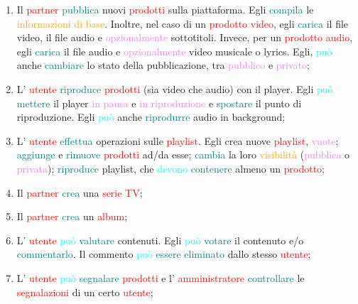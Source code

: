 \begin{enumerate}
    \item Il \textcolor{red}{partner} \textcolor{teal}{pubblica} nuovi \textcolor{red}{prodotti} sulla piattaforma. Egli \textcolor{teal}{compila}
    le \textcolor{orange}{informazioni di base}. Inoltre, nel caso di un 
    \textcolor{red}{prodotto video}, egli \textcolor{teal}{carica} il file video, il file audio e \textcolor{violet}{opzionalmente} sottotitoli.
    Invece, per un \textcolor{red}{prodotto audio}, egli \textcolor{teal}{carica} il file audio e \textcolor{violet}{opzionalmente} video musicale o lyrics.
    Egli, \textcolor{cyan}{può} anche \textcolor{teal}{cambiare} lo stato della pubblicazione, tra \textcolor{violet}{pubblico} e \textcolor{violet}{privato};
    \item L' \textcolor{red}{utente} \textcolor{teal}{riproduce} \textcolor{red}{prodotti} (sia video che audio) con il player. Egli \textcolor{cyan}{può} \textcolor{teal}{mettere}
    il player \textcolor{violet}{in pausa} e \textcolor{violet}{in riproduzione} e \textcolor{teal}{spostare} il punto di riproduzione. 
    Egli \textcolor{cyan}{può} anche \textcolor{teal}{riprodurre} audio in background;
    \item L' \textcolor{red}{utente} \textcolor{teal}{effettua} operazioni sulle \textcolor{red}{playlist}. Egli crea nuove \textcolor{red}{playlist}, \textcolor{violet}{vuote};
    \textcolor{teal}{aggiunge} e \textcolor{teal}{rimuove} \textcolor{red}{prodotti} ad/da esse;  \textcolor{teal}{cambia} la loro \textcolor{orange}{visibilità} (\textcolor{violet}{pubblica} o \textcolor{violet}{privata});
    \textcolor{teal}{riproduce} playlist, che \textcolor{cyan}{devono}  \textcolor{teal}{contenere} almeno un  \textcolor{red}{prodotto};
    \item Il \textcolor{red}{partner} \textcolor{teal}{crea} una \textcolor{red}{serie TV};
    \item Il \textcolor{red}{partner} \textcolor{teal}{crea} un \textcolor{red}{album};
    \item L' \textcolor{red}{utente} \textcolor{cyan}{può} \textcolor{teal}{valutare} contenuti. Egli \textcolor{cyan}{può} \textcolor{teal}{votare} il contenuto
    e/o  \textcolor{teal}{commentarlo}. Il commento \textcolor{cyan}{può} \textcolor{teal}{essere eliminato} dallo stesso \textcolor{red}{utente};
    \item L' \textcolor{red}{utente} \textcolor{cyan}{può} \textcolor{teal}{segnalare} \textcolor{red}{prodotti} e l' \textcolor{red}{amministratore} \textcolor{teal}{controllare} le 
    \textcolor{red}{segnalazioni} di un certo \textcolor{red}{utente};

\end{enumerate}
